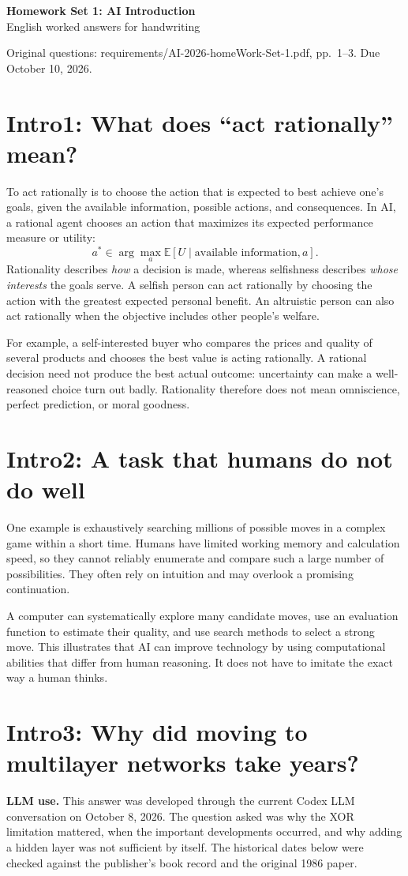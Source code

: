 \documentclass[11pt,a4paper]{article}
\newcommand{\question}[2]{\section*{#1: #2}}
\begin{document}
\begin{center}{\Large\bfseries Homework Set 1: AI Introduction}\\[4pt]English worked answers for handwriting\end{center}
\small Original questions: requirements/AI-2026-homeWork-Set-1.pdf, pp.\ 1--3. Due October 10, 2026.\normalsize

\question{Intro1}{What does ``act rationally'' mean?}
To act rationally is to choose the action that is expected to best achieve one's goals, given the available information, possible actions, and consequences. In AI, a rational agent chooses an action that maximizes its expected performance measure or utility:
\[
a^*\in\arg\max_{a}\mathbb{E}[U\mid\text{available information},a].
\]
Rationality describes \emph{how} a decision is made, whereas selfishness describes \emph{whose interests} the goals serve. A selfish person can act rationally by choosing the action with the greatest expected personal benefit. An altruistic person can also act rationally when the objective includes other people's welfare.

For example, a self-interested buyer who compares the prices and quality of several products and chooses the best value is acting rationally. A rational decision need not produce the best actual outcome: uncertainty can make a well-reasoned choice turn out badly. Rationality therefore does not mean omniscience, perfect prediction, or moral goodness.

\question{Intro2}{A task that humans do not do well}
One example is exhaustively searching millions of possible moves in a complex game within a short time. Humans have limited working memory and calculation speed, so they cannot reliably enumerate and compare such a large number of possibilities. They often rely on intuition and may overlook a promising continuation.

A computer can systematically explore many candidate moves, use an evaluation function to estimate their quality, and use search methods to select a strong move. This illustrates that AI can improve technology by using computational abilities that differ from human reasoning. It does not have to imitate the exact way a human thinks.

\newpage
\question{Intro3}{Why did moving to multilayer networks take years?}
\textbf{LLM use.} This answer was developed through the current Codex LLM conversation on October 8, 2026. The question asked was why the XOR limitation mattered, when the important developments occurred, and why adding a hidden layer was not sufficient by itself. The historical dates below were checked against the publisher's book record and the original 1986 paper.
\end{document}
